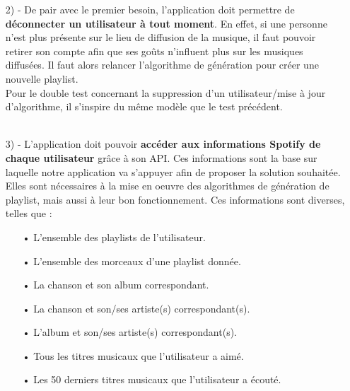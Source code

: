 \documentclass[12pt, openany]{report}
\begin{document}
\begin{itemize}
\item[2) -] De pair avec le premier besoin, l'application doit permettre de \textbf{déconnecter un utilisateur à tout moment}. En effet, si une personne n'est plus présente sur le lieu de diffusion de la musique, il faut pouvoir retirer son compte afin que ses goûts n'influent plus sur les musiques diffusées. Il faut alors relancer l'algorithme de génération pour créer une nouvelle playlist.
\\

Pour le double test concernant la suppression d'un utilisateur/mise à jour d'algorithme, il s'inspire du même modèle que le test précédent.
\\
\\

\item[3) -] L'application doit pouvoir \textbf{accéder aux informations Spotify de chaque utilisateur} grâce à son API. Ces informations sont la base sur laquelle notre application va s'appuyer afin de proposer la solution souhaitée. Elles sont nécessaires à la mise en oeuvre des algorithmes de génération de playlist, mais aussi à leur bon fonctionnement. Ces informations sont diverses, telles que :
\begin{itemize}
\item[•] L'ensemble des playlists de l'utilisateur.
\item[•] L'ensemble des morceaux d'une playlist donnée.
\item[•] La chanson et son album correspondant.
\item[•] La chanson et son/ses artiste(s) correspondant(s).
\item[•] L'album et son/ses artiste(s) correspondant(s).
\item[•] Tous les titres musicaux que l'utilisateur a aimé.
\item[•] Les 50 derniers titres musicaux que l'utilisateur a écouté.


\end{itemize}
\end{itemize}
\end{document}

